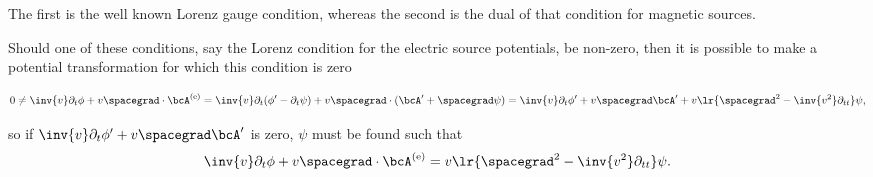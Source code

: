 The first is the well known Lorenz gauge condition, whereas the second is the dual of that condition for magnetic sources.

Should one of these conditions, say the Lorenz condition for the electric source potentials, be non-zero, then it is possible to make a potential transformation for which this condition is zero

\begin{dmath}\label{eqn:potentialMethods:1680}
0 \ne
\inv{v} \partial_t \phi + v \spacegrad \cdot \bcA^\e
=
\inv{v} \partial_t (\phi' - \partial_t \psi) + v \spacegrad \cdot (\bcA' + \spacegrad \psi)
=
\inv{v} \partial_t \phi' + v \spacegrad \bcA'
+ v \lr{ \spacegrad^2 - \inv{v^2} \partial_{tt} } \psi,
\end{dmath}

so if \( \inv{v} \partial_t \phi' + v \spacegrad \bcA' \) is zero, \( \psi \) must be found such that
\begin{dmath}\label{eqn:potentialMethods:1700}
\inv{v} \partial_t \phi + v \spacegrad \cdot \bcA^\e
= v \lr{ \spacegrad^2 - \inv{v^2} \partial_{tt} } \psi.
\end{dmath}
